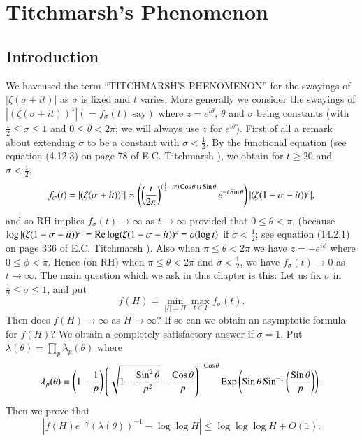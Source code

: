
\chapter{Titchmarsh's Phenomenon}\label{c3}

\section{Introduction}\label{c3:sec3.1}

We have\pageoriginale used the term ``TITCHMARSH'S PHENOMENON'' for the swayings of $|\zeta(\sigma + it)|$ as $\sigma$ is fixed and $t$ varies.  More generally we consider the swayings of $|(\zeta(\sigma + it))^z|(=f_{\sigma} (t) \text{ say})$ where $z = e^{i\theta}$, $\theta$ and $\sigma$ being constants (with $\frac{1}{2} \leq \sigma \leq 1$ and $0 \leq \theta < 2\pi$; we will always use $z$ for $e^{i\theta}$). First of all a remark about extending $\sigma$ to be a constant with $\sigma < \frac{1}{2}$. By the functional equation (see equation (4.12.3) on page 78 of E.C. Titchmarsh \cite{Titchmarsh1}), we obtain for $t \geq 20$ and $\sigma < \frac{1}{2}$, 
$$
f_\sigma (t) = |(\zeta(\sigma + it))^z| \asymp \left( \left( \frac{t}{2\pi}\right)^{(\frac{1}{2} - \sigma) \operatorname{Cos} \theta + t \operatorname{Sin} \theta}  e^{-t \operatorname{Sin} \theta} \right) |(\zeta (1-\sigma - it))^z|,
$$
and so RH implies $f_{\sigma} (t) \to \infty$ as $ t \to \infty$ provided that $0 \leq \theta < \pi$, (because $\log |(\zeta (1-\sigma - it))^z| = \operatorname{Re} \log (\zeta(1-\sigma - it))^z = o (\log t)$ if $\sigma <\frac{1}{2}$; see equation (14.2.1) on page 336 of E.C. Titchmarsh \cite{Titchmarsh1}). Also when $\pi \leq \theta < 2\pi$ we have $z = -e^{i\phi}$ where $0 \leq \phi <\pi$. Hence (on RH) when $\pi \leq \theta < 2\pi$ and $\sigma < \frac{1}{2}$, we have $f_{\sigma} (t) \to 0$ as $t \to \infty$. The main question which we ask in this chapter is this: Let us fix $\sigma$ in $\frac{1}{2} \leq \sigma \leq 1$, and put
$$
f(H) = \min\limits_{|I| = H} \max\limits_{t \in I} f_{\sigma} (t).
$$
Then does $f(H) \to \infty$ as $H \to \infty$? If so can we obtain an asymptotic formula for $f(H)$? We obtain a completely satisfactory answer if $\sigma =1$. Put $\lambda(\theta) =\prod\limits_{p} \lambda_p(\theta)$ where 
{\fontsize{10}{12}\selectfont
$$
\lambda_p(\theta) = \left(1-\frac{1}{p} \right) \left(\sqrt{1-\frac{\operatorname{Sin}^2 \theta}{p^2}} -  \frac{\operatorname{Cos} \theta}{p} \right)^{-\operatorname{Cos} \theta} \operatorname{Exp} \left( \operatorname{Sin} \theta \operatorname{Sin}^{-1} \left( \frac{\operatorname{Sin}\theta}{p} \right)\right).
$$}
Then we prove that 
$$
|f(H) e^{-\gamma} (\lambda(\theta))^{-1} - \log \log H |\leq \log \log \log H + O(1).
$$
